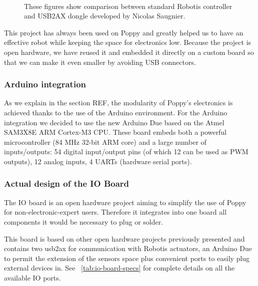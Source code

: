 \begin{figure}[tb]
\centering
    \hfil
    \\

    \caption{These figures show comparison between standard Robotis controller and USB2AX dongle developed by Nicolas Saugnier. }
    \label{fig:usb2ax}
\end{figure}

This project has always been used on Poppy and greatly helped us to have an effective robot while keeping the space for electronics low.
Because the project is open hardware, we have reused it and embedded it directly on a custom board so that we can make it even smaller by avoiding USB connectors.

\subsubsection{Arduino integration} %
As we explain in the section REF, the modularity of Poppy’s electronics is achieved thanks to the use of the Arduino environment. For the Arduino integration we decided to use the new Arduino Due based on the Atmel SAM3X8E ARM Cortex-M3 CPU. These board embeds both a powerful microcontroller (84 MHz 32-bit ARM core) and a large number of inputs/outputs: 54 digital input/output pins (of which 12 can be used as PWM outputs), 12 analog inputs, 4 UARTs (hardware serial ports).


\subsubsection{Actual design of the IO Board} %
The IO board is an open hardware project aiming to simplify the use of Poppy for non-electronic-expert users. Therefore it integrates into one board all components it would be necessary to plug or solder.


This board is based on other open hardware projects previously presented and contains two usb2ax for communication with Robotis actuators, an Arduino Due to permit the extension of the sensors space plus convenient ports to easily plug external devices in. See \figurename~\ref{tab:io-board-specs} for complete details on all the available IO ports.

